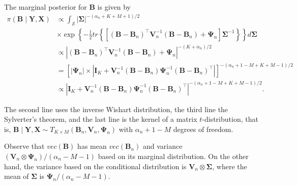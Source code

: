 The marginal posterior for ${\bm{B}}$ is given by
\begin{align*}
	\pi({\bm{B}}\mid {\bm{Y}},{\bm{X}})&\propto \int_{\bm{\mathcal{S}}} \left|{\bm \Sigma} \right|^{-(\alpha_n+K+M+1)/2}\\
	&\times\exp\left\lbrace -\frac{1}{2} tr\left\{\left[({\bm{B}}-{\bm{B}}_n)^{\top}{\bm{V}}_n^{-1}({\bm{B}}-{\bm{B}}_n)+{\bm{\Psi}}_n \right]  {\bm \Sigma}^{-1}\right\}\right\rbrace d{\bm{\Sigma}} \\
 	&\propto|({\bm{B}}-{\bm{B}}_n)^{\top}{\bm{V}}_n^{-1}({\bm{B}}-{\bm{B}}_n)+{\bm{\Psi}}_n|^{-(K+\alpha_n)/2}\\
 	&=\left[|{\bm{\Psi}}_n|\times|{\bm{I}}_K+{\bm{V}}_n^{-1}({\bm{B}}-{\bm{B}}_n){\bm{\Psi}}_n^{-1}({\bm{B}}-{\bm{B}}_n)^{\top}|\right]^{-(\alpha_n+1-M+K+M-1)/2}\\
 	&\propto|{\bm{I}}_K+{\bm{V}}_n^{-1}({\bm{B}}-{\bm{B}}_n){\bm{\Psi}}_n^{-1}({\bm{B}}-{\bm{B}}_n)^{\top}|^{-(\alpha_n+1-M+K+M-1)/2}.
\end{align*}

The second line uses the inverse Wishart distribution, the third line the Sylverter's theorem, and the last line is the kernel of a matrix $t$-distribution, that is, ${\bm{B}}\mid {\bm{Y}},{\bm{X}}\sim T_{K\times M}({\bm{B}}_n,{\bm{V}}_n,{\bm{\Psi}}_n)$ with $\alpha_n+1-M$ degrees of freedom. 

Observe that $vec({\bm{B}})$ has mean $vec({\bm{B}}_n)$ and variance $({\bm{V}}_n\otimes{\bm{\Psi}}_n)/(\alpha_n-M-1)$ based on its marginal distribution. On the other hand, the variance based on the conditional distribution is ${\bm{V}}_n\otimes{\bm{\Sigma}}$, where the mean of ${\bm{\Sigma}}$ is ${\bm{\Psi}}_n/(\alpha_n-M-1)$.   

